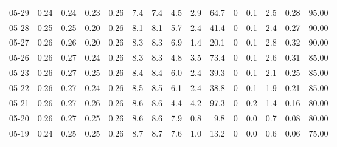\begin{threeparttable}
{\begin{tabular}{lrrrrrrrrrrrrrr}
  05-29 &          0.24 &          0.24 &          0.23 &        0.26 &                 7.4 &                7.4 &                 4.5 &        2.9 &         64.7 &              0 &                 0.1 &              2.5 &            0.28 &                  95.00 \\
  05-28 &          0.25 &          0.25 &          0.20 &        0.26 &                 8.1 &                8.1 &                 5.7 &        2.4 &         41.4 &              0 &                 0.1 &              2.4 &            0.27 &                  90.00 \\
  05-27 &          0.26 &          0.26 &          0.20 &        0.26 &                 8.3 &                8.3 &                 6.9 &        1.4 &         20.1 &              0 &                 0.1 &              2.8 &            0.32 &                  90.00 \\
  05-26 &          0.26 &          0.27 &          0.24 &        0.26 &                 8.3 &                8.3 &                 4.8 &        3.5 &         73.4 &              0 &                 0.1 &              2.6 &            0.31 &                  85.00 \\
  05-23 &          0.26 &          0.27 &          0.25 &        0.26 &                 8.4 &                8.4 &                 6.0 &        2.4 &         39.3 &              0 &                 0.1 &              2.1 &            0.25 &                  85.00 \\
  05-22 &          0.26 &          0.27 &          0.24 &        0.26 &                 8.5 &                8.5 &                 6.1 &        2.4 &         38.8 &              0 &                 0.1 &              1.9 &            0.21 &                  85.00 \\
  05-21 &          0.26 &          0.27 &          0.26 &        0.26 &                 8.6 &                8.6 &                 4.4 &        4.2 &         97.3 &              0 &                 0.2 &              1.4 &            0.16 &                  80.00 \\
  05-20 &          0.26 &          0.27 &          0.25 &        0.26 &                 8.6 &                8.6 &                 7.9 &        0.8 &          9.8 &              0 &                 0.0 &              0.7 &            0.08 &                  80.00 \\
  05-19 &          0.24 &          0.25 &          0.25 &        0.26 &                 8.7 &                8.7 &                 7.6 &        1.0 &         13.2 &              0 &                 0.0 &              0.6 &            0.06 &                  75.00 \\

\end{tabular}}
\end{threeparttable}
